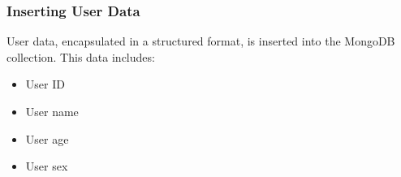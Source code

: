 \subsubsection{Inserting User Data}
User data, encapsulated in a structured format, is inserted into the MongoDB collection. This data includes:
\begin{itemize}
    \item User ID
    \item User name
    \item User age
    \item User sex
\end{itemize}

